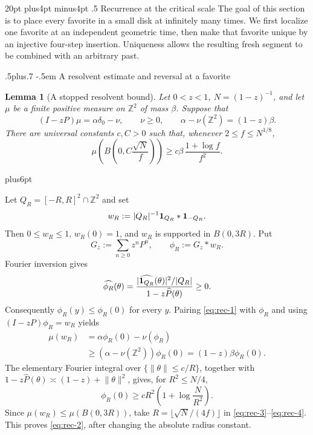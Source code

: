\documentclass[12pt,reqno]{amsart}
\makeatletter
\def\section{\@startsection{section}{1}{0pt}%
  {20pt plus4pt minus4pt}
  {.5\linespacing}
  {\normalfont\bfseries}}
\def\subsection{\@startsection{subsection}{2}{0pt}%
  {.5\linespacing plus.7\linespacing}
  {-.5em}
  {\normalfont\scshape}}
\theoremstyle{plain}
\newtheorem{lemma}[theorem]{Lemma}
\theoremstyle{definition}
\theoremstyle{remark}
\renewenvironment{proof}[1][\proofname]{%
  \par
  \pushQED{\qed}%
  \normalfont
  \topsep6pt plus6pt\relax
  \trivlist
  \item[\hskip\labelsep\slshape #1\@addpunct{.}]%
  \ignorespaces
}{%
  \popQED
  \endtrivlist
  \@endpefalse
}
\DeclareRobustCommand{\qed}{%
  \leavevmode\unskip\penalty9999\hbox{}\nobreak
  \ifmmode
    \makebox[0pt][l]{\qquad\hbox{\qedsymbol}}%
  \else
    \qquad\hbox{\qedsymbol}%
  \fi
}
\renewcommand{\qedsymbol}{\rule[.47pt]{4pt}{6pt}}
\numberwithin{equation}{section}
\makeatother
\begin{document}
\section{Recurrence at the critical scale}\label{sec:recurrence}
The goal of this section is to place every favorite in a small disk at infinitely
many times. We first localize one favorite at an independent geometric time,
then make that favorite unique by an injective four-step insertion. Uniqueness
allows the resulting fresh segment to be combined with an arbitrary past.

\subsection{A resolvent estimate and reversal at a favorite}

\begin{lemma}[A stopped resolvent bound]\label{lem:stopped-resolvent}
Let \(0<z<1\), \(N=(1-z)^{-1}\), and let \(\mu\) be a finite positive
measure on \(\mathbb Z^2\) of mass \(\beta\).  Suppose that
\begin{equation}
(I-zP)\mu=\alpha\delta_0-\nu,\qquad \nu\ge0,
       \qquad \alpha-\nu(\mathbb Z^2)=(1-z)\beta.                 \label{eq:rec-1}
\end{equation}
There are universal constants \(c,C>0\) such that, whenever
\(2\le f\le N^{1/8}\),
\begin{equation}
\mu\left(B\left(0,C\frac{\sqrt N}{f}\right)\right)
       \ge c\beta\,\frac{1+\log f}{f^2}.                         \label{eq:rec-2}
\end{equation}
\end{lemma}

\begin{proof}
Let \(Q_R=[-R,R]^2\cap\mathbb Z^2\) and set
\[
 w_R:=|Q_R|^{-1}{\bf1}_{Q_R}*{\bf1}_{-Q_R}.
\]
Then \(0\le w_R\le1\), \(w_R(0)=1\), and \(w_R\) is supported in
\(B(0,3R)\).  Put
\[
 G_z:=\sum_{n\ge0}z^nP^n,\qquad \phi_R:=G_z*w_R.
\]
Fourier inversion gives
\[
 \widehat{\phi_R}(\theta)=
 \frac{|\widehat{{\bf1}_{Q_R}}(\theta)|^2/|Q_R|}
      {1-z\widehat P(\theta)}\ge0.
\]
Consequently \(\phi_R(y)\le\phi_R(0)\) for every \(y\).  Pairing \eqref{eq:rec-1} with
\(\phi_R\) and using \((I-zP)\phi_R=w_R\) yields
\begin{equation}
\begin{split}
 \mu(w_R)
 &=\alpha\phi_R(0)-\nu(\phi_R)\\
 &\ge(\alpha-\nu(\mathbb Z^2))\phi_R(0)
   =(1-z)\beta\phi_R(0).                                      \label{eq:rec-3}
\end{split}
\end{equation}
The elementary Fourier integral over
\(\{\lVert\theta\rVert\le c/R\}\), together with
\(1-z\widehat P(\theta)\asymp (1-z)+\lVert\theta\rVert^2\),
gives, for \(R^2\le N/4\),
\begin{equation}
\phi_R(0)\ge cR^2\left(1+\log\frac N{R^2}\right).              \label{eq:rec-4}
\end{equation}
Since \(\mu(w_R)\le\mu(B(0,3R))\), take
\(R=\lfloor\sqrt N/(4f)\rfloor\) in \eqref{eq:rec-3}--\eqref{eq:rec-4}.  This proves \eqref{eq:rec-2},
after changing the absolute radius constant.
\end{proof}
\end{document}

